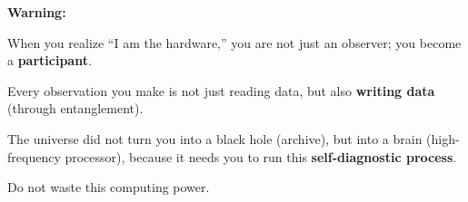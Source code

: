 \textbf{Warning:}

When you realize ``I am the hardware,'' you are not just an observer; you become a \textbf{participant}.

Every observation you make is not just reading data, but also \textbf{writing data} (through entanglement).

The universe did not turn you into a black hole (archive), but into a brain (high-frequency processor), because it needs you to run this \textbf{self-diagnostic process}.

Do not waste this computing power.


